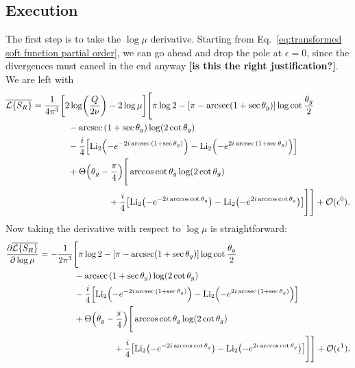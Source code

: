\documentclass[11pt,twoside,reqno]{amsart}
\theoremstyle{plain}
\theoremstyle{remark}
\theoremstyle{definition}
\theoremstyle{remark}
\theoremstyle{definition}
\theoremstyle{definition}
\newcommand{\cL}{\mathcal{L}}
\newcommand{\cO}{\mathcal{O}}
\newcommand{\Li}{\mathrm{Li}}
\begin{document}
\subsection{Execution}
	The first step is to take the $\log \mu$ derivative. Starting from Eq.~\ref{eq:transformed soft function partial order}, we can go ahead and drop the pole at $\epsilon = 0$, since the divergences must cancel in the end anyway {\color{red}\textbf{[is this the right justification?]}}. We are left with
	\begin{equation}\label{eq:transformed soft dropped poles}
	\begin{aligned}
		\overline{\cL\qty{S_R}} &= \frac{1}{4\pi^3}\qty[2\log(\frac{Q}{2\nu}) - 2\log\mu] \Bigg[\pi \log 2 - \qty[\pi - \arcsec(1 + \sec\theta_g)]\log\cot\frac{\theta_g}{2} \\
			&\qquad\qquad - \arcsec\qty(1 + \sec\theta_g) \log(2\cot\theta_g) \\
			&\qquad\qquad - \frac{i}{4}\qty[\Li_2\qty(-e^{-2i\arcsec\qty(1 + \sec\theta_g)}) - \Li_2\qty(-e^{2i\arcsec\qty(1 + \sec\theta_g)})] \\
			&\qquad\qquad+ \Theta\qty(\theta_g - \frac{\pi}{4})\Bigg[ \arccos\cot\theta_g \log(2\cot\theta_g) \\
			&\hspace{3cm}+ \frac{i}{4}\qty[\Li_2\qty(-e^{-2i\arccos\cot\theta_g}) - \Li_2\qty(-e^{2i\arccos\cot\theta_g})] \Bigg] \Bigg] + \cO(\epsilon^0).
	\end{aligned}
	\end{equation}
	Now taking the derivative with respect to $\log \mu$ is straightforward:
	\begin{equation}
	\begin{aligned}
		\frac{\partial \overline{\cL\qty{S_R}}}{\partial \log \mu} &= -\frac{1}{2\pi^3} \Bigg[\pi \log 2 - \qty[\pi - \arcsec(1 + \sec\theta_g)]\log\cot\frac{\theta_g}{2} \\
			&\qquad\qquad - \arcsec\qty(1 + \sec\theta_g) \log(2\cot\theta_g) \\
			&\qquad\qquad - \frac{i}{4}\qty[\Li_2\qty(-e^{-2i\arcsec\qty(1 + \sec\theta_g)}) - \Li_2\qty(-e^{2i\arcsec\qty(1 + \sec\theta_g)})] \\
			&\qquad\qquad+ \Theta\qty(\theta_g - \frac{\pi}{4})\Bigg[ \arccos\cot\theta_g \log(2\cot\theta_g) \\
			&\hspace{3cm}+ \frac{i}{4}\qty[\Li_2\qty(-e^{-2i\arccos\cot\theta_g}) - \Li_2\qty(-e^{2i\arccos\cot\theta_g})] \Bigg] \Bigg] + \cO(\epsilon^1).
	\end{aligned}
	\end{equation}
\end{document}
